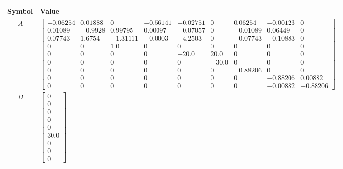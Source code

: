 \begin{tabular}{cl}
\hline
  Symbol  & Value                                                                                                                                                                                                                                                                                                                                                                                                                                                                                                                                             \\
\hline
   $A$    & $\left[\begin{matrix}-0.06254 & 0.01888 & 0 & -0.56141 & -0.02751 & 0 & 0.06254 & -0.00123 & 0\\0.01089 & -0.9928 & 0.99795 & 0.00097 & -0.07057 & 0 & -0.01089 & 0.06449 & 0\\0.07743 & 1.6754 & -1.31111 & -0.0003 & -4.2503 & 0 & -0.07743 & -0.10883 & 0\\0 & 0 & 1.0 & 0 & 0 & 0 & 0 & 0 & 0\\0 & 0 & 0 & 0 & -20.0 & 20.0 & 0 & 0 & 0\\0 & 0 & 0 & 0 & 0 & -30.0 & 0 & 0 & 0\\0 & 0 & 0 & 0 & 0 & 0 & -0.88206 & 0 & 0\\0 & 0 & 0 & 0 & 0 & 0 & 0 & -0.88206 & 0.00882\\0 & 0 & 0 & 0 & 0 & 0 & 0 & -0.00882 & -0.88206\end{matrix}\right]$ \\
   $B$    & $\left[\begin{matrix}0\\0\\0\\0\\0\\30.0\\0\\0\\0\end{matrix}\right]$                                                                                                                                                                                                                                                                                                                                                                                                                                                                             \\

\end{tabular}
